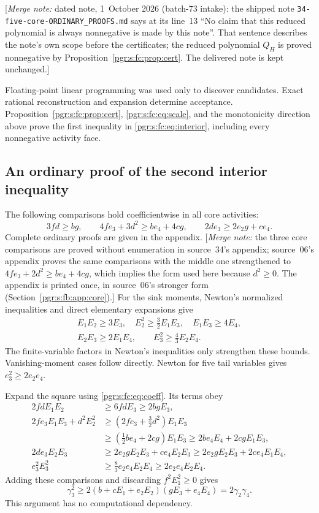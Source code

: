 \documentclass[11pt]{article}
\numberwithin{equation}{section}
\theoremstyle{definition}\newtheorem{definition}[theorem]{Definition}\newtheorem{remark}[theorem]{Remark}
\newcommand{\mnote}[1]{[\textit{Merge note:} #1]}
\begin{document}
\mnote{dated note, 1~October 2026 (batch-73 intake): the shipped note
\nolinkurl{34-five-core-ORDINARY_PROOFS.md} says at its line~13 ``No claim
that this reduced polynomial is always nonnegative is made by this note''.
That sentence describes the note's own scope before the certificates; the
reduced polynomial $Q_H$ is proved nonnegative by
Proposition~\ref{pgr:s:fc:prop:cert}. The delivered note is kept
unchanged.}

Floating-point linear programming was used only to discover candidates. Exact rational reconstruction and expansion determine acceptance. Proposition~\ref{pgr:s:fc:prop:cert}, \eqref{pgr:s:fc:eq:scale}, and the monotonicity direction above prove the first inequality in \eqref{pgr:s:fc:eq:interior}, including every nonnegative activity face.

\subsection{An ordinary proof of the second interior inequality}
The following comparisons hold coefficientwise in all core activities:
\begin{equation}\label{pgr:s:fc:eq:corelemmas}
 3fd\ge bg,\qquad
 4fe_3+3d^2\ge be_4+4cg,\qquad
 2de_3\ge2e_2g+ce_4.
\end{equation}
Complete ordinary proofs are given in the appendix.
\mnote{the three core comparisons are proved without enumeration in
source~34's appendix; source~06's appendix proves the same comparisons
with the middle one strengthened to $4fe_3+2d^2\ge be_4+4cg$, which
implies the form used here because $d^2\ge0$. The appendix is printed
once, in source~06's stronger form (Section~\ref{pgr:s:fb:app:core}).}
 For the sink moments, Newton's normalized inequalities and direct elementary expansions give
\begin{equation}\label{pgr:s:fc:eq:sinklemmas}
\begin{gathered}
 E_1E_2\ge3E_3,\quad E_2^2\ge\tfrac32E_1E_3,\quad
 E_1E_3\ge4E_4,\\
 E_2E_3\ge2E_1E_4,\qquad E_3^2\ge\tfrac43E_2E_4.
\end{gathered}
\end{equation}
The finite-variable factors in Newton's inequalities only strengthen these bounds. Vanishing-moment cases follow directly. Newton for five tail variables gives $e_3^2\ge2e_2e_4$.

Expand the square using \eqref{pgr:s:fc:eq:coeff}. Its terms obey
\begin{align*}
 2fdE_1E_2&\ge6fdE_3\ge2bgE_3,\\
 2fe_3E_1E_3+d^2E_2^2
 &\ge(2fe_3+\tfrac32d^2)E_1E_3\\
 &\ge(\tfrac12be_4+2cg)E_1E_3
 \ge2be_4E_4+2cgE_1E_3,\\
 2de_3E_2E_3&\ge2e_2gE_2E_3+ce_4E_2E_3
 \ge2e_2gE_2E_3+2ce_4E_1E_4,\\
 e_3^2E_3^2&\ge\tfrac83e_2e_4E_2E_4\ge2e_2e_4E_2E_4.
\end{align*}
Adding these comparisons and discarding $f^2E_1^2\ge0$ gives
\[
 \gamma_3^2\ge2(b+cE_1+e_2E_2)(gE_3+e_4E_4)=2\gamma_2\gamma_4.
\]
This argument has no computational dependency.
\end{document}
